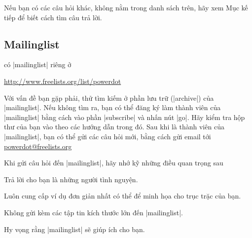 Nếu bạn có các câu hỏi khác, không nằm trong danh sách trên, hãy xem
Mục kế tiếp để biết cách tìm câu trả lời.


\subsection{Mailinglist}

\label{sec:mailinglist}

có |mailinglist| riêng ở
\begin{center}
\url{http://www.freelists.org/list/powerdot}
\end{center}
Với vấn đề bạn gặp phải, thử tìm kiếm ở phần lưu trữ (|archive|)
của |mailinglist|.
Nếu không tìm ra, bạn có thể đăng ký làm thành viên của |mailinglist|
bằng cách vào phần |subscribe| và nhấn nút |go|. Hãy kiểm tra hộp thư
của bạn vào theo các hướng dẫn trong đó. Sau khi là thành viên của
|mailinglist|, bạn có thể gửi các câu hỏi mới, bằng cách gửi email tới
\url{powerdot@freelists.org}

Khi gửi câu hỏi đến |mailinglist|, hãy nhớ kỹ những điều quan trọng sau
\begin{dinglist}{44}%
\item %
Trả lời cho bạn là những người tình nguyện.
\item %
Luôn cung cấp ví dụ đơn giản nhất có thể để minh họa cho trục trặc của bạn.
\item %
Không gửi kèm các tập tin kích thước lớn đến |mailinglist|.
\end{dinglist}

Hy vọng rằng |mailinglist| sẽ giúp ích cho bạn.

\endinput
